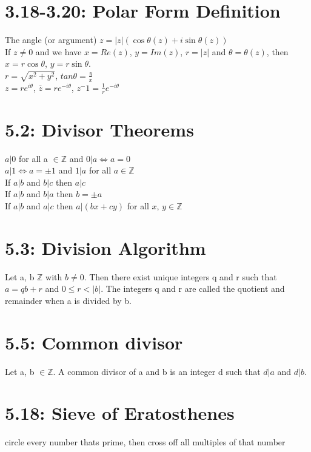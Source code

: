 \documentclass[10pt,letter]{article}
\begin{document}
\section*{3.18-3.20: Polar Form Definition}
The angle (or argument) $z = |z|(\cos\theta(z) + i\sin\theta(z))$\\
If $z \neq 0$ and we have $x = Re(z)$, $y = Im(z)$, $r = |z|$ and $\theta = \theta(z)$, then $x = r\cos\theta$, $y = r\sin\theta$. \\ 
$r = \sqrt{x^2+y^2}$, $tan\theta = \frac{y}{x}$\\ 
$z = re^{i\theta}$, $\bar{z} = re^{-i\theta}$, $z^-1 = \frac{1}{r}e^{-i\theta}$

\section*{5.2: Divisor Theorems}
$a|0$ for all a $\in \mathbb{Z}$ and $0|a \Longleftrightarrow a = 0$\\
$a|1 \Longleftrightarrow a = \pm 1$ and $1 | a$ for all $a \in \mathbb{Z}$\\ 
If $a|b$ and $b|c$ then $a|c$\\ 
If $a|b$ and $b|a$ then $b = \pm a$\\ 
If $a|b$ and $a|c$ then $a|(bx+cy)$ for all $x$, $y \in \mathbb{Z}$

\section*{5.3: Division Algorithm}
Let a, b $\mathbb{Z}$ with $b \neq 0$. Then there exist unique integers q and r such that $a = qb + r$ and $0 \leq r < |b|$. The integers q and r are called the quotient and remainder when a is divided by b. 


\section*{5.5: Common divisor}
Let a, b $\in \mathbb{Z}$. A common divisor of a and b is an integer d such that $d|a$ and $d|b$. 

\section*{5.18: Sieve of Eratosthenes}
circle every number thats prime, then cross off all multiples of that number
\end{document}
